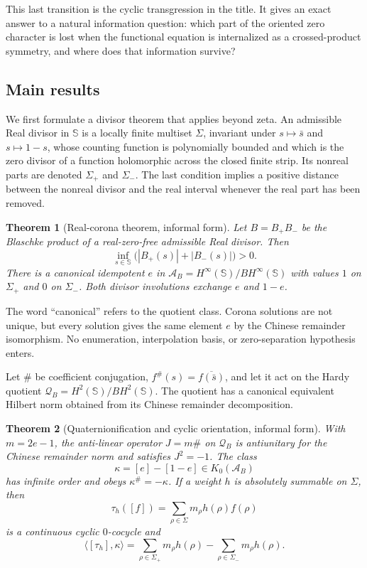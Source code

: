 \documentclass[11pt]{article}
\newtheorem{theorem}{Theorem}[section]
\theoremstyle{definition}
\theoremstyle{remark}
\newcommand{\A}{\mathcal A}
\newcommand{\Q}{\mathcal Q}
\begin{document}
This last transition is the cyclic transgression in the title.  It gives an
exact answer to a natural information question: which part of the oriented
zero character is lost when the functional equation is internalized as a
crossed-product symmetry, and where does that information survive?

\subsection{Main results}

We first formulate a divisor theorem that applies beyond zeta.  An admissible
Real divisor in $\mathbb S$ is a locally finite multiset $\Sigma$, invariant
under $s\mapsto\bar s$ and $s\mapsto1-s$, whose counting function is polynomially
bounded and which is the zero divisor of a function holomorphic across the
closed finite strip.  Its nonreal parts are denoted $\Sigma_+$ and $\Sigma_-$.
The last condition implies a positive distance between the nonreal divisor and
the real interval whenever the real part has been removed.

\begin{theorem}[Real-corona theorem, informal form]\label{thm:intro-corona}
Let $B=B_+B_-$ be the Blaschke product of a real-zero-free admissible Real
divisor.  Then
\[
          \inf_{s\in\mathbb S}\bigl(|B_+(s)|+|B_-(s)|\bigr)>0.
\]
There is a canonical idempotent $e$ in
$\A_B=H^\infty(\mathbb S)/BH^\infty(\mathbb S)$ with values $1$ on
$\Sigma_+$ and $0$ on $\Sigma_-$.  Both divisor involutions exchange $e$ and
$1-e$.
\end{theorem}

The word ``canonical'' refers to the quotient class.  Corona solutions are not
unique, but every solution gives the same element $e$ by the Chinese remainder
isomorphism.  No enumeration, interpolation basis, or zero-separation
hypothesis enters.

Let $\#$ be coefficient conjugation,
$f^\#(s)=\overline{f(\bar s)}$, and let it act on the Hardy quotient
$\Q_B=H^2(\mathbb S)/BH^2(\mathbb S)$.  The quotient has a canonical equivalent
Hilbert norm obtained from its Chinese remainder decomposition.

\begin{theorem}[Quaternionification and cyclic orientation, informal form]
\label{thm:intro-quaternion}
With $m=2e-1$, the anti-linear operator $J=m\#$ on $\Q_B$ is antiunitary for
the Chinese remainder norm and satisfies $J^2=-1$.  The class
\[
              \kappa=[e]-[1-e]\in K_0(\A_B)
\]
has infinite order and obeys $\kappa^\#=-\kappa$.  If a weight $h$ is absolutely
summable on $\Sigma$, then
\[
 \tau_h([f])=\sum_{\rho\in\Sigma}m_\rho h(\rho)f(\rho)
\]
is a continuous cyclic $0$-cocycle and
\[
 \langle[\tau_h],\kappa\rangle
 =\sum_{\rho\in\Sigma_+}m_\rho h(\rho)
  -\sum_{\rho\in\Sigma_-}m_\rho h(\rho).
\]
\end{theorem}
\end{document}
